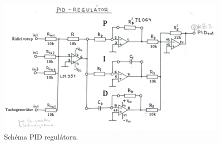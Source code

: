 \begin{figure}[!hbt] %
	\centering
	\includegraphics[]{img/schema_PID_regulatoru.png} %
	\caption{Schéma PID regulátoru.} %
	\label{fig:schema_PID} %
	\end{figure}		
		


			
